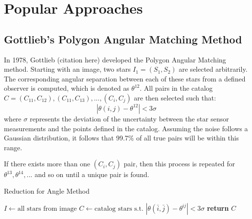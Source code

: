 \section{Popular Approaches}

\subsection{Gottlieb's Polygon Angular Matching Method}
In 1978, Gottlieb (citation here) developed the Polygon Angular Matching method. Starting with an image, two stars $I_1 = (S_1, S_2)$ are selected arbitrarily. The corresponding angular separation between each of these stars from a defined observer is computed, which is denoted as $\theta^{12}$. All pairs in the catalog $C = (C_{11}, C_{12}), (C_{11}, C_{13}), ..., (C_i, C_j)$ are then selected such that:
\begin{equation}
| \theta(i, j) - \theta^{12} | < 3 \sigma
\end{equation}
where $\sigma$ represents the deviation of the uncertainty between the star sensor measurements and the points defined in the catalog. Assuming the noise follows a Gaussian distribution, it follows that 99.7\% of all true pairs will be within this range.

If there exists more than one $(C_i, C_j)$ pair, then this process is repeated for $\theta^{13}, \theta^{14}, ...$ and so on until a unique pair is found.

\begin{algorithm}
\caption{Reduction for Angle Method}\label{Angle Reduction}
\begin{algorithmic}[1]

\State $I \gets \text{all stars from image}$
\State $C \gets \text{catalog stars s.t. } |\theta(\bar{i}, \bar{j}) - \theta^{ij}| < 3\sigma$
\State \textbf{return} $C$
\EndIf
\EndFor
\EndFor
\EndProcedure
\end{algorithmic}
\end{algorithm}

